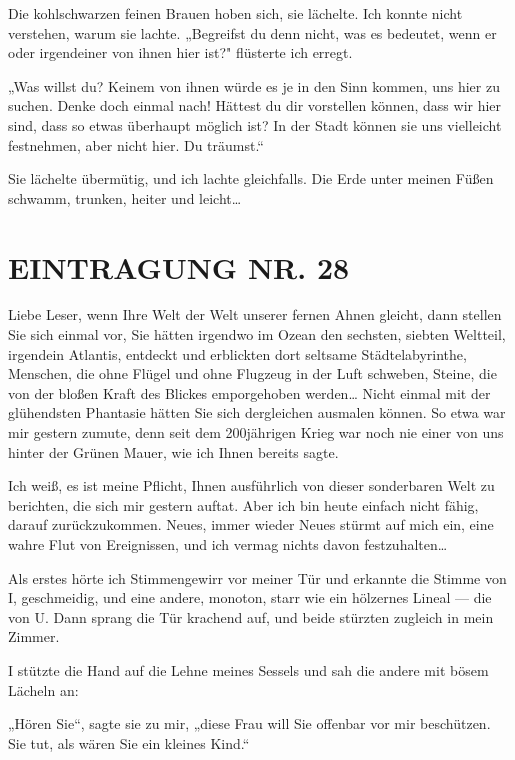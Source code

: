 Die kohlschwarzen
feinen Brauen hoben sich, sie lächelte. Ich konnte nicht verstehen,
warum sie lachte. „Begreifst du denn nicht, was es bedeutet, wenn
er oder irgendeiner von ihnen hier ist?" flüsterte ich erregt.

„Was willst du? Keinem von ihnen würde es je in den Sinn kommen,
uns hier zu suchen. Denke doch einmal nach! Hättest du dir
vorstellen können, dass wir hier sind, dass so etwas überhaupt
möglich ist? In der Stadt können sie uns vielleicht festnehmen,
aber nicht hier. Du träumst.“

Sie lächelte übermütig, und ich lachte gleichfalls. Die Erde unter
meinen Füßen schwamm, trunken, heiter und leicht\ldots{}

\section{EINTRAGUNG NR. 28}

Liebe Leser, wenn Ihre Welt der Welt unserer fernen Ahnen gleicht,
dann stellen Sie sich einmal vor, Sie hätten irgendwo im Ozean den
sechsten, siebten Weltteil, irgendein Atlantis, entdeckt und
erblickten dort seltsame Städtelabyrinthe, Menschen, die ohne
Flügel und ohne Flugzeug in der Luft schweben, Steine, die von der
bloßen Kraft des Blickes emporgehoben werden\ldots{} Nicht einmal mit
der glühendsten Phantasie hätten Sie sich dergleichen ausmalen
können. So etwa war mir gestern zumute, denn seit dem 200jährigen
Krieg war noch nie einer von uns hinter der Grünen Mauer, wie ich
Ihnen bereits sagte.

Ich weiß, es ist meine Pflicht, Ihnen
ausführlich von dieser sonderbaren Welt zu berichten, die sich mir
gestern auftat. Aber ich bin heute einfach nicht fähig, darauf
zurückzukommen. Neues, immer wieder Neues stürmt auf mich ein, eine
wahre Flut von Ereignissen, und ich vermag nichts davon
festzuhalten\ldots{}

Als erstes hörte ich Stimmengewirr vor meiner Tür und erkannte die
Stimme von I, geschmeidig, und eine andere, monoton, starr wie ein
hölzernes Lineal — die von U. Dann sprang die Tür krachend auf, und
beide stürzten zugleich in mein Zimmer.

I stützte die Hand auf die Lehne meines Sessels und sah die andere
mit bösem Lächeln an:

„Hören Sie“, sagte sie zu mir, „diese Frau will Sie offenbar vor
mir beschützen. Sie tut, als wären Sie ein kleines Kind.“

